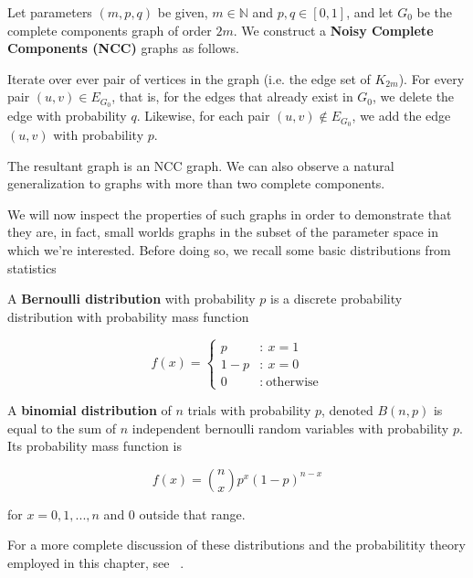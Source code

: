 \begin{definition}
  \label{def:ncc}
  Let parameters $(m,p,q)$ be given, $m \in \mathbb{N}$ and $p,q \in [0,1]$, and let $G_0$ be the
  complete components graph of order $2m$. We construct a \textbf{Noisy Complete Components (NCC)}
  graphs as follows.

  Iterate over ever pair of vertices in the graph (i.e. the edge set of
  $K_{2m}$). For every pair $(u,v) \in E_{G_0}$, that is, for the edges that
  already exist in $G_0$, we delete the edge with probability $q$. Likewise, for
  each pair $(u,v) \notin E_{G_0}$, we add the edge $(u,v)$ with probability
  $p$.

  The resultant graph is an NCC graph. We can also observe a natural generalization to graphs with more than two complete components.
\end{definition}

We will now inspect the properties of such graphs in order to demonstrate that they are, in fact,
small worlds graphs in the subset of the parameter space in which we're interested. Before doing so,
we recall some basic distributions from statistics

\begin{definition}
  A \textbf{Bernoulli distribution} with probability $p$ is a discrete probability distribution
  with probability mass function

  \[
    f(x) =
      \begin{cases}
        p &:~ x = 1 \\
        1-p &:~ x = 0 \\
        0 &:~ \text{otherwise}
      \end{cases}
    \]

  A \textbf{binomial distribution} of $n$ trials with probability $p$, denoted $B(n,p)$ is equal to
  the sum of $n$ independent bernoulli random variables with probability $p$. Its probability mass
  function is

  \[
    f(x) = {n \choose x} p^x(1-p)^{n-x}
  \]

  for $x = 0,1,...,n$ and $0$ outside that range.

  For a more complete discussion of these distributions and the probabilitity theory employed in
  this chapter, see ~\cite{CaseBerg:01}.
\end{definition}


